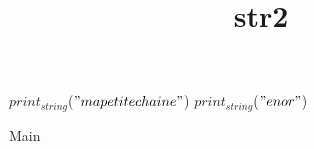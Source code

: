 \documentclass[8pt]{article}
\title{str2}
\begin{document}
\maketitle


\begin{algorithm}[H]
$print_{string}$($ "ma petite chaine" $)\;
$print_{string}$($ " en or" $)\;
\caption{Main}
\end{algorithm}
\end{document}
